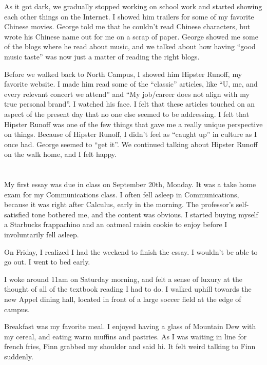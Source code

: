 As it got dark, we gradually stopped working on school work and started showing
each other things on the Internet.  I showed him trailers for some of my
favorite Chinese movies.  George told me that he couldn't read Chinese
characters, but wrote his Chinese name out for me on a scrap of paper.  George
showed me some of the blogs where he read about music, and we talked about how
having ``good music taste'' was now just a matter of reading the right blogs.  

Before we walked back to North Campus, I showed him Hipster Runoff, my favorite
website.  I made him read some of the ``classic'' articles, like ``U, me, and
every relevant concert we attend'' and ``My job/career does not align with my
true personal brand''.  I watched his face.  I felt that these articles touched
on an aspect of the present day that no one else seemed to be addressing.  I
felt that Hipster Runoff was one of the few things that gave me a really unique
perspective on things.  Because of Hipster Runoff, I didn't feel as ``caught
up'' in culture as I once had.   George seemed to ``get it''.   We continued
talking about Hipster Runoff on the walk home, and I felt happy.

\section{}

My first essay was due in class on September 20th, Monday.  It was a take home
exam for my Communications class.  I often fell asleep in Communications,
because it was right after Calculus, early in the morning.  The professor's
self-satisfied tone bothered me, and the content was obvious.  I started buying
myself a Starbucks frappachino and an oatmeal raisin cookie to enjoy before I
involuntarily fell asleep.

On Friday, I realized I had the weekend to finish the essay.  I wouldn't be able
to go out. I went to bed early.

I woke around 11am on Saturday morning, and felt a sense of luxury at the
thought of all of the textbook reading I had to do.  I walked uphill towards the
new Appel dining hall, located in front of a large soccer field at the edge of
campus.

Breakfast was my favorite meal.  I enjoyed having a glass of Mountain Dew with
my cereal, and eating warm muffins and pastries.  As I was waiting in line for
french fries, Finn grabbed my shoulder and said hi.  It felt weird talking to
Finn suddenly.

